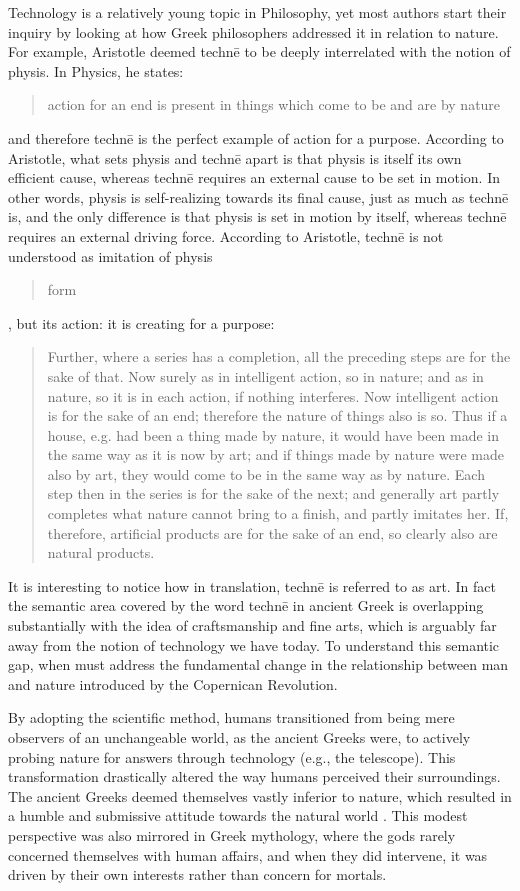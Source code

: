 Technology is a relatively young topic in Philosophy, yet most authors start their inquiry by looking at how Greek philosophers addressed it in relation to nature. For example, Aristotle deemed technē to be deeply interrelated with the notion of physis. In Physics, he states: \blockcquote{Atwill2009}{action for an end is present in things which come to be and are by nature} and therefore technē is the perfect example of action for a purpose. According to Aristotle, what sets physis and technē apart is that physis is itself its own efficient cause, whereas technē requires an external cause to be set in motion. In other words, physis is self-realizing towards its final cause, just as much as technē is, and the only difference is that physis is set in motion by itself, whereas  technē requires an external driving force.
\SetCiteCommand{\transcite}
According to Aristotle, technē is not understood as imitation of physis \blockquote{form}, but its action: it is creating for a purpose: \blockcquote[Physics, Book II, Part 8]{Aristotle1983}{Further, where a series has a completion, all the preceding steps are for the sake of that. Now surely as in intelligent action, so in nature; and as in nature, so it is in each action, if nothing interferes. Now intelligent action is for the sake of an end; therefore the nature of things also is so. Thus if a house, e.g. had been a thing made by nature, it would have been made in the same way as it is now by art; and if things made by nature were made also by art, they would come to be in the same way as by nature. Each step then in the series is for the sake of the next; and generally art partly completes what nature cannot bring to a finish, and partly imitates her. If, therefore, artificial products are for the sake of an end, so clearly also are natural products.}
\SetCiteCommand{\citep}
It is interesting to notice how in translation, technē is referred to as art. In fact the semantic area covered by the word technē in ancient Greek is overlapping substantially with the idea of craftsmanship and fine arts, which is arguably far away from the notion of technology we have today. To understand this semantic gap, when must address the fundamental change in the relationship between man and nature introduced by the Copernican Revolution.

By adopting the scientific method, humans transitioned from being mere observers of an unchangeable world, as the ancient Greeks were, to actively probing nature for answers through technology (e.g., the telescope). This transformation drastically altered the way humans perceived their surroundings. The ancient Greeks deemed themselves vastly inferior to nature, which resulted in a humble and submissive attitude towards the natural world \citep{Galimberti1989}. This modest perspective was also mirrored in Greek mythology, where the gods rarely concerned themselves with human affairs, and when they did intervene, it was driven by their own interests rather than concern for mortals.

